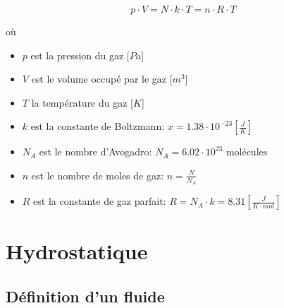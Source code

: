 \documentclass[
    11pt,
    a4paper,
    oneside,
    headinlcude, footinclude,
    twoside,
]{report}
\begin{document}
\begin{highlightBox}[frametitle={Équations d'était du gaz parfait}]
\begin{equation}
    p \cdot V = N \cdot k \cdot T = n \cdot R \cdot T
\end{equation}
\end{highlightBox}
où 
\begin{itemize}
    \item $p$ est la pression du gaz [$Pa$]
    \item $V$ est le volume occupé par le gaz [$m^{3}$]
    \item $T$ la température du gaz [$K$]
    \item $k$ est la constante de Boltzmann: $x = 1.38 \cdot 10^{-23}
        \left[\frac{J}{K}\right]$
    \item $N_{A}$ est le nombre d'Avogadro: $N_{A} = 6.02 \cdot 10 ^{23}
        \text{ molécules } $
    \item $n$ est le nombre de moles de gaz: $n = \frac{N}{N_{A}}$
    \item $R$ est la constante de gaz parfait: $R = N_{A} \cdot k = 8.31
        \left[\frac{J}{K\cdot mol}\right]$
\end{itemize}

\section{Hydrostatique}


\subsection{Définition d'un fluide}
\label{sub:definition_d_un_fluide}
\end{document}
